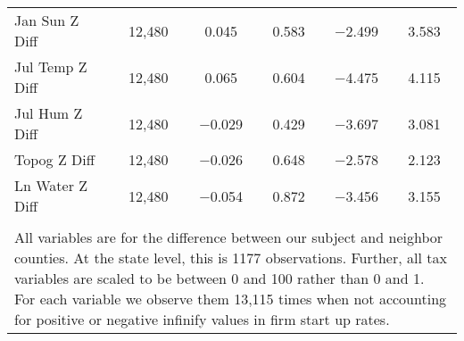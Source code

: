 \begin{table}[!htbp]
\begin{tabular}{@{\extracolsep{5pt}}lccccc}
Jan Sun Z Diff & 12,480 & 0.045 & 0.583 & $-$2.499 & 3.583 \\ 
Jul Temp Z Diff & 12,480 & 0.065 & 0.604 & $-$4.475 & 4.115 \\ 
Jul Hum Z Diff & 12,480 & $-$0.029 & 0.429 & $-$3.697 & 3.081 \\ 
Topog Z Diff & 12,480 & $-$0.026 & 0.648 & $-$2.578 & 2.123 \\ 
Ln Water Z Diff & 12,480 & $-$0.054 & 0.872 & $-$3.456 & 3.155 \\ 
\hline \\[-1.8ex] 
\multicolumn{6}{l}{All variables are for the difference between our subject and neighbor counties. At the state level, this is 1177 observations. Further, all tax variables are scaled to be between 0 and 100 rather than 0 and 1. For each variable we observe them 13,115 times when not accounting for positive or negative infinify values in firm start up rates.} \\ 
\end{tabular} 
\end{table} 

